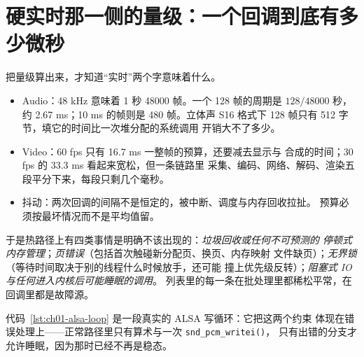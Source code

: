 \documentclass[12pt,a4paper,fontset=fandol]{ctexbook}
\newcommand{\Fn}[1]{\texttt{#1()}}
\newcommand{\Lang}[1]{\textsf{#1}}
\newcommand{\DomAud}{\Lang{Audio}}
\newcommand{\DomVid}{\Lang{Video}}
\begin{document}
\section{硬实时那一侧的量级：一个回调到底有多少微秒}
\label{sec:ch01-hard-budget}

把量级算出来，才知道``实时''两个字意味着什么。

\begin{itemize}
  \item \DomAud{}：48 kHz 意味着 1 秒 48000 帧。一个 128 帧的周期是
        $128/48000$ 秒，约 2.67 ms；10 ms 的帧则是 480 帧。立体声 S16
        格式下 128 帧只有 512 字节，填它的时间比一次堆分配的系统调用
        开销大不了多少。
  \item \DomVid{}：60 fps 只有 16.7 ms 一整帧的预算，还要减去显示与
        合成的时间；30 fps 的 33.3 ms 看起来宽松，但一条链路里
        采集、编码、网络、解码、渲染五段平分下来，每段只剩几个毫秒。
  \item 抖动：两次回调的间隔不是恒定的，被中断、调度与内存回收拉扯。
        预算必须按最坏情况而不是平均值留。
\end{itemize}

于是热路径上有四类事情是明确不该出现的：\emph{垃圾回收或任何不可预测的
停顿式内存管理}；\emph{页错误}（包括首次触碰新分配页、换页、内存映射
文件缺页）；\emph{无界锁}（等待时间取决于别的线程什么时候放手，还可能
撞上优先级反转）；\emph{阻塞式 IO 与任何进入内核后可能睡眠的调用}。
列表里的每一条在批处理里都稀松平常，在回调里都是故障源。

代码~\ref{lst:ch01-alsa-loop} 是一段真实的 ALSA 写循环：它把这两个约束
体现在错误处理上——正常路径里只有算术与一次 \Fn{snd\_pcm\_writei}，
只有出错的分支才允许睡眠，因为那时已经不再是稳态。
\end{document}
